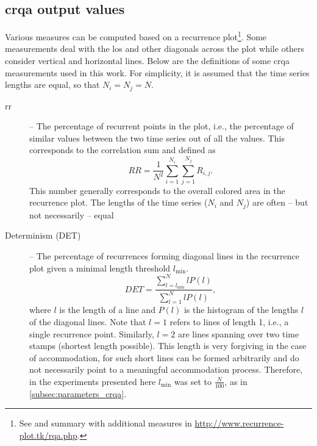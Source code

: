 \subsection{\Acs{crqa} output values}
\label{subsec:output_values}

Various measures can be computed based on a recurrence plot\footnote{See \citet{Marwan2007recurrence} and summary with additional measures in \url{http://www.recurrence-plot.tk/rqa.php}.}.
Some measurements deal with the \ac{los} and other diagonals across the plot while others consider vertical and horizontal lines.
Below are the definitions of some \ac{crqa} measurements used in this work.
For simplicity, it is assumed that the time series lengths are equal, so that $N_i=N_j=N$.

\begin{description}
	\item[\Acf{rr}] -- The percentage of recurrent points in the plot, i.e., the percentage of similar values between the two time series out of all the values.
	This corresponds to the correlation sum and defined as
	\begin{equation}
		\label{eq:rr}
		RR = \frac{1}{N^2} \sum_{i=1}^{N_i} \sum_{j=1}^{N_j} R_{i,j}.
	\end{equation}
	This number generally corresponds to the overall colored area in the recurrence plot.
	The lengths of the time series ($N_i$ and $N_j$) are often -- but not necessarily -- equal
	
	\item[Determinism (DET)] -- The percentage of recurrences forming diagonal lines in the recurrence plot given a minimal length threshold $l_{\min}$.
	\begin{equation}
		\label{eq:det}
		DET = \frac{\sum_{l=l_{\min}}^{N} l P(l)}{\sum_{l=1}^N l P(l)},
	\end{equation}
	where $l$ is the length of a line and $P(l)$ is the histogram of the lengths $l$ of the diagonal lines.
	Note that $l=1$ refers to lines of length 1, i.e., a single recurrence point.	
	Similarly, $l=2$ are lines spanning over two time stamps (shortest length possible).
	This length is very forgiving in the case of accommodation, for such short lines can be formed arbitrarily and do not necessarily point to a meaningful accommodation process.
	Therefore, in the experiments presented here $l_{\min}$ was set to $\frac{N}{100}$, as in \cref{subsec:parameters_crqa}.
	

\end{description}
